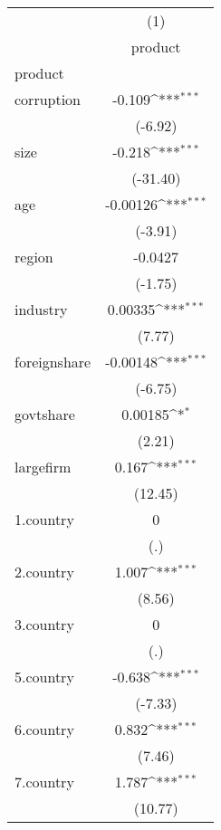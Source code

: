{
\def\sym#1{\ifmmode^{#1}\else\(^{#1}\)\fi}
\begin{tabular}{l*{1}{c}}
\hline\hline
            &\multicolumn{1}{c}{(1)}\\
            &\multicolumn{1}{c}{product}\\
\hline
product     &                     \\
corruption  &      -0.109\sym{***}\\
            &     (-6.92)         \\
[1em]
size        &      -0.218\sym{***}\\
            &    (-31.40)         \\
[1em]
age         &    -0.00126\sym{***}\\
            &     (-3.91)         \\
[1em]
region      &     -0.0427         \\
            &     (-1.75)         \\
[1em]
industry    &     0.00335\sym{***}\\
            &      (7.77)         \\
[1em]
foreignshare&    -0.00148\sym{***}\\
            &     (-6.75)         \\
[1em]
govtshare   &     0.00185\sym{*}  \\
            &      (2.21)         \\
[1em]
largefirm   &       0.167\sym{***}\\
            &     (12.45)         \\
[1em]
1.country   &           0         \\
            &         (.)         \\
[1em]
2.country   &       1.007\sym{***}\\
            &      (8.56)         \\
[1em]
3.country   &           0         \\
            &         (.)         \\
[1em]
5.country   &      -0.638\sym{***}\\
            &     (-7.33)         \\
[1em]
6.country   &       0.832\sym{***}\\
            &      (7.46)         \\
[1em]
7.country   &       1.787\sym{***}\\
            &     (10.77)         \\

\end{tabular}}
